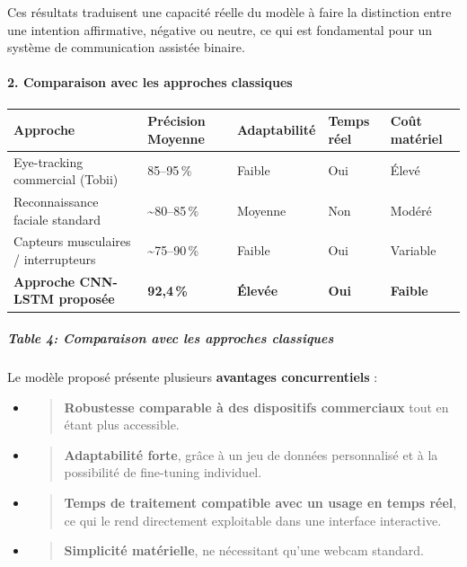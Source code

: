 \documentclass[
]{article}
\begin{document}
Ces résultats traduisent une capacité réelle du modèle à faire la distinction entre une intention affirmative, négative ou neutre, ce qui est fondamental pour un système de communication assistée binaire.

\hypertarget{comparaison-avec-les-approches-classiques}{%
\paragraph{\texorpdfstring{\textbf{2. Comparaison avec les approches classiques}}{2. Comparaison avec les approches classiques}}\label{comparaison-avec-les-approches-classiques}}

\begin{longtable}[]{@{}lllll@{}}
\toprule
\textbf{Approche} & \textbf{Précision Moyenne} & \textbf{Adaptabilité} & \textbf{Temps réel} & \textbf{Coût matériel} \\
\midrule
\endhead
Eye-tracking commercial (Tobii) & 85--95\,\% & Faible & Oui & Élevé \\
Reconnaissance faciale standard & \textasciitilde80--85\,\% & Moyenne & Non & Modéré \\
Capteurs musculaires / interrupteurs & \textasciitilde75--90\,\% & Faible & Oui & Variable \\
\textbf{Approche CNN-LSTM proposée} & \textbf{92,4\,\%} & \textbf{Élevée} & \textbf{Oui} & \textbf{Faible} \\
\bottomrule
\end{longtable}

\hypertarget{table-4-comparaison-avec-les-approches-classiques}{%
\subparagraph{Table 4: Comparaison avec les approches classiques}\label{table-4-comparaison-avec-les-approches-classiques}}

Le modèle proposé présente plusieurs \textbf{avantages concurrentiels} :

\begin{itemize}
\item
  \begin{quote}
  \textbf{Robustesse comparable à des dispositifs commerciaux} tout en étant plus accessible.
  \end{quote}
\item
  \begin{quote}
  \textbf{Adaptabilité forte}, grâce à un jeu de données personnalisé et à la possibilité de fine-tuning individuel.
  \end{quote}
\item
  \begin{quote}
  \textbf{Temps de traitement compatible avec un usage en temps réel}, ce qui le rend directement exploitable dans une interface interactive.
  \end{quote}
\item
  \begin{quote}
  \textbf{Simplicité matérielle}, ne nécessitant qu'une webcam standard.
  \end{quote}
\end{itemize}
\end{document}
